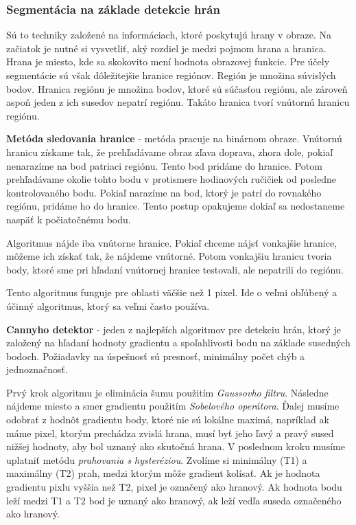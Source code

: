 \subsubsection{Segmentácia na základe detekcie hrán}
Sú to techniky založené na informáciach, ktoré poskytujú hrany v obraze. Na začiatok je nutné si vysvetliť, aký rozdiel je medzi pojmom hrana a hranica. Hrana je miesto, kde sa skokovito mení hodnota obrazovej funkcie. Pre účely segmentácie sú však dôležitejšie hranice regiónov. Región je množina súvislých bodov. Hranica regiónu je množina bodov, ktoré sú súčasťou regiónu, ale zároveň aspoň jeden z ich susedov nepatrí regiónu. Takáto hranica tvorí vnútornú hranicu regiónu. \cite{pocitacove_videnie_v_praxi} 

\textbf{Metóda sledovania hranice}
\label{sec:follow_border} - metóda pracuje na binárnom obraze. Vnútornú hranicu získame tak, že prehľadávame obraz zľava doprava, zhora dole, pokiaľ nenarazíme na bod patriaci regiónu. Tento bod pridáme do hranice. Potom prehľadávame okolie tohto bodu v protismere hodinových ručičiek od posledne kontrolovaného bodu. Pokiaľ narazíme na bod, ktorý je patrí do rovnakého regiónu, pridáme ho do hranice. Tento postup opakujeme dokiaľ sa nedostaneme naspäť k počiatočnému bodu. \cite{pocitacove_videnie_v_praxi} 

Algoritmus nájde iba vnútorne hranice. Pokiaľ chceme nájsť vonkajšie hranice, môžeme ich získať tak, že nájdeme vnútorné. Potom vonkajšiu hranicu tvoria body, ktoré sme pri hľadaní vnútornej hranice testovali, ale nepatrili do regiónu. 

Tento algoritmus funguje pre oblasti väčšie než 1 pixel. Ide o veľmi obľúbený a účinný algoritmus, ktorý sa veľmi často používa.

\textbf{Cannyho detektor} \cite{cannyho_detektor} - jeden z najlepších algoritmov pre detekciu hrán, ktorý je založený na hľadaní hodnoty gradientu a spoľahlivosti bodu na základe susedných bodoch. Požiadavky na úspešnosť sú presnosť, minimálny počet chýb a jednoznačnosť. 

Prvý krok algoritmu je eliminácia šumu použitím \textit{Gaussovho filtru}. Následne nájdeme miesto a smer gradientu použitím \textit{Sobelového operátora}. Ďalej musíme odobrať z hodnôt gradientu  body, ktoré nie sú lokálne maximá, napríklad ak máme pixel, ktorým prechádza zvislá hrana, musí byť jeho ľavý a pravý sused nižšej hodnoty, aby bol uznaný  ako skutočná hrana. V poslednom kroku musíme uplatniť metódu \textit{prahovania s hysteréziou}. Zvolíme si minimálny (T1) a maximálny (T2) prah, medzi ktorým môže gradient kolísať. Ak je hodnota gradientu pixlu vyššia než T2, pixel je označený ako hranový. Ak hodnota bodu leží medzi T1 a T2 bod je uznaný ako hranový, ak leží vedľa suseda označeného ako hranový. \cite{cannyho_detektor}



